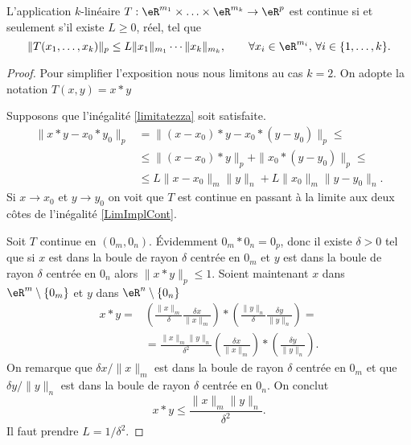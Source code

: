 \begin{proposition}
  L'application $k$-linéaire  $T: \eR^{m_1}\times \ldots \times\eR^{m_k}\to\eR^p $ est continue si et seulement s'il existe $L\geq 0$, réel, tel que
  \begin{equation}\label{limitatezza}
     \|T(x_1, \ldots,x_k)\|_p\leq L \|x_1\|_{m_1}\cdots\|x_k\|_{m_k}, \qquad \forall x_i\in\eR^{m_i},\,\forall i \in \{1,\ldots, k\}.
  \end{equation}
\end{proposition}

\begin{proof}
  Pour simplifier l'exposition nous nous limitons au cas $k=2$. On adopte la notation $T(x,y)=x*y$

Supposons que l'inégalité \eqref{limitatezza} soit satisfaite. 
\begin{equation}\label{LimImplCont}
  \begin{aligned}
    \|x*y-x_0*y_0\|_p&=\|(x-x_0)*y-x_0*(y-y_0)\|_p\leq\\
&\leq \|(x-x_0)*y\|_p+\|x_0*(y-y_0)\|_p\leq\\
&\leq L\|x-x_0\|_m\|y\|_n + L\|x_0\|_m\|y-y_0\|_n.
  \end{aligned}
\end{equation}
Si $x\to x_0$ et $y\to y_0$  on voit que $T$ est continue en passant à la limite aux deux côtes de l'inégalité \eqref{LimImplCont}.

Soit $T$ continue en $(0_m,0_n)$. Évidemment $0_m*0_n=0_p$, donc il existe $\delta>0$ tel que si $x$ est dans la boule de rayon $\delta$ centrée en $0_m$ et  $y$ est dans la boule de rayon $\delta$ centrée en $0_n$ alors $\|x*y\|_p\leq 1$. Soient maintenant  $x$ dans $\eR^m\setminus\{ 0_m\}$ et $y$ dans $\eR^n\setminus\{ 0_n\}$
\begin{equation}
  \begin{aligned}
    x*y=&\left(\frac{\|x\|_m}{\delta}\frac{\delta x}{\|x\|_m}\right)*\left(\frac{\|y\|_n}{\delta}\frac{\delta y}{\|y\|_n}\right)=\\
&=\frac{\|x\|_m\|y\|_n}{\delta^2} \left(\frac{\delta x}{\|x\|_m}\right)*\left(\frac{\delta y}{\|y\|_n}\right).
  \end{aligned}
 \end{equation}
On remarque que $\delta x/\|x\|_m$ est dans la boule de rayon $\delta$ centrée en $0_m$ et que $\delta y/\|y\|_n$ est dans la boule de rayon $\delta$ centrée en $0_n$. On conclut 
\[
 x*y\leq \frac{\|x\|_m\|y\|_n}{\delta^2}.
\]
Il faut prendre $L=1/\delta^2$.
\end{proof}
